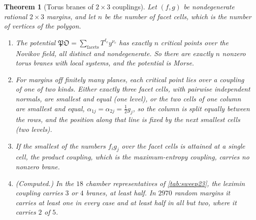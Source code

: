 \documentclass[11pt]{article}
\newtheorem{theorem}{Theorem}[section]
\theoremstyle{definition}
\theoremstyle{remark}
\begin{document}
\begin{theorem}[Torus branes of $2\times3$ couplings]\label{thm:sweep23}
Let $(f,g)$ be nondegenerate rational $2\times3$ margins, and let $n$ be the number of facet cells, which is the number of vertices of the polygon.
\begin{enumerate}[label=(\roman*)]
\item The potential $\mathfrak{PO}=\sum_{\mathrm{facets}}T^{\ell_c}y^{\nu_c}$ has exactly $n$ critical points over the Novikov field, all distinct and
  nondegenerate. So there are exactly $n$ nonzero torus branes with local systems, and the potential is Morse.
\item For margins off finitely many planes, each critical point lies over a coupling of one of two kinds. Either exactly three facet cells,
  with pairwise independent normals, are smallest and equal (\emph{one level}), or the two cells of one column are smallest and equal,
  $\alpha_{1j}=\alpha_{2j}=\frac12g_j$, so the column is split equally between the rows, and the position along that line is fixed by the next
  smallest cells (\emph{two levels}).
\item If the smallest of the numbers $f_ig_j$ over the facet cells is attained at a single cell, the product coupling, which is the
  maximum-entropy coupling, carries no nonzero brane.
\item (Computed.) In the $18$ chamber representatives of \cref{tab:sweep23}, the leximin coupling carries $3$ or $4$ branes, at least half. In
  $2970$ random margins it carries at least one in every case and at least half in all but two, where it carries $2$ of $5$.
\end{enumerate}
\end{theorem}
\end{document}
